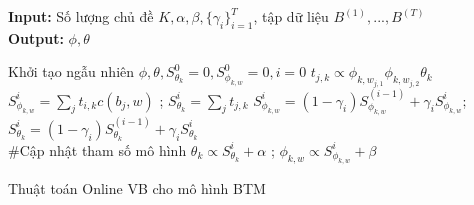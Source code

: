 \documentclass[pdf]{beamer}
\begin{document}
%
\begin{frame}
\begin{algorithm}[H]
	\textbf{Input: } Số lượng chủ đề $K, \alpha, \beta, \{\gamma_i\}_{i = 1}^T$, tập dữ liệu $B^{(1)}, ..., B^{(T)}$  \\
	\textbf{Output: } $\phi, \theta$ 
	\begin{algorithmic}[1]
		\STATE Khởi tạo ngẫu nhiên $\phi, \theta,  S_{\theta_k}^0 = 0, S_{\phi_{k, w}}^0 = 0, i = 0$
		\STATE $ t_{j, k} \propto {\phi_{k,w_{j,1}} \phi_{k,w_{j,2}} \theta_k}$
		\ENDFOR
		\STATE  $S_{\phi_{k, w}}^i = \sum_{j}{t_{i, k}c(b_j, w)}$ ; \space  $S_{\theta_k}^i = \sum_{j}{t_{j, k}} $
		\STATE$S_{\phi_{k, w}}^i = (1 - \gamma_i) S_{\phi_{k, w}}^{(i-1)} + \gamma_i S_{\phi_{k, w}}^i$; \space $S_{\theta_k}^i = (1 - \gamma_i)S_{\theta_k}^{(i-1)} + \gamma_i S_{\theta_k}^i$\\ \#Cập nhật tham số mô hình
		\STATE $\theta_k \propto S_{\theta_k}^i + \alpha$ ; \space $\phi_{k, w} \propto S_{\phi_{k, w}}^i + \beta $
		\ENDFOR
	\end{algorithmic}
	\caption{Thuật toán Online VB cho mô hình BTM }
\end{algorithm}
\end{frame}
\end{document}
